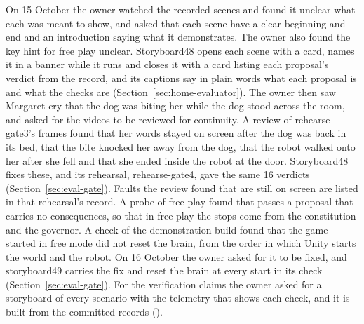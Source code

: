 On 15 October the owner watched the recorded scenes and found it unclear what each was meant to
show, and asked that each scene have a clear beginning and end and an introduction saying what it
demonstrates. The owner also found the key hint for free play unclear. Storyboard48 opens each
scene with a card, names it in a banner while it runs and closes it with a card listing each
proposal's verdict from the record, and its captions say in plain words what each proposal is and
what the checks are (Section~\ref{sec:home-evaluator}). The owner then saw Margaret cry that the dog
was biting her while the dog stood across the room, and asked for the videos to be reviewed for
continuity. A review of rehearse-gate3's frames found that her words stayed on screen after the
dog was back in its bed, that the bite knocked her away from the dog, that the robot walked onto
her after she fell and that she ended inside the robot at the door. Storyboard48 fixes these, and
its rehearsal, rehearse-gate4, gave the same 16 verdicts (Section~\ref{sec:eval-gate}). Faults the
review found that are still on screen are listed in that rehearsal's record. A probe of free play
found that \deme{} passes a proposal that carries no consequences, so that in free play the stops
come from the constitution and the governor. A check of the demonstration build found that the game
started in free mode did not reset the brain, from the order in which Unity starts the world and
the robot. On 16 October the owner asked for it to be fixed, and storyboard49 carries the fix and
reset the brain at every start in its check (Section~\ref{sec:eval-gate}). For the verification claims the owner
asked for a storyboard of every scenario with the telemetry that shows each check, and it is built
from the committed records ().

